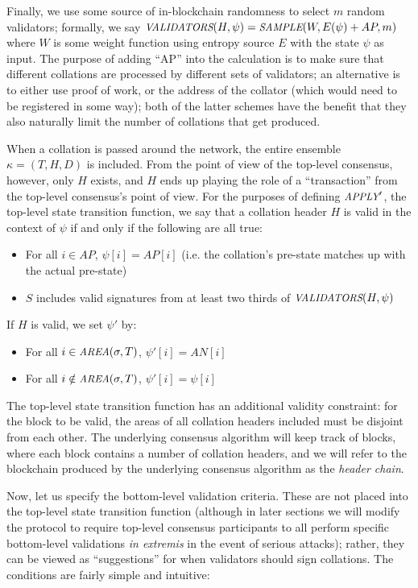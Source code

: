 \documentclass[11pt,a4paper]{article}
\makeatletter
\theoremstyle{plain}
\theoremstyle{definition}
\theoremstyle{remark}
\newcommand{\ie}{i.e.\@\xspace}
\newcommand{\makeintoafunction}[1]{\textit{\uppercase{\small #1}}}
\newcommand{\APPLY}{\makeintoafunction{apply}}
\newcommand{\AREA}{\makeintoafunction{area}}
\newcommand{\VALIDATORS}{\makeintoafunction{validators}}
\newcommand{\SAMPLE}{\makeintoafunction{sample}}
\makeatother
\begin{document}
Finally, we use some source of in-blockchain randomness to select $m$ random validators; formally, we say $\VALIDATORS(H, \psi) = \SAMPLE(W, E(\psi) + AP, m)$ where $W$ is some weight function using entropy source $E$ with the state $\psi$ as input. The purpose of adding ``AP'' into the calculation is to make sure that different collations are processed by different sets of validators; an alternative is to either use proof of work, or the address of the collator (which would need to be registered in some way); both of the latter schemes have the benefit that they also naturally limit the number of collations that get produced.

When a collation is passed around the network, the entire ensemble $\kappa = (T, H, D)$ is included. From the point of view of the top-level consensus, however, only $H$ exists, and $H$ ends up playing the role of a ``transaction'' from the top-level consensus's point of view. For the purposes of defining $\APPLY'$, the top-level state transition function, we say that a collation header $H$ is valid in the context of $\psi$ if and only if the following are all true:

\begin{itemize}
\item
For all $i \in AP$, $\psi[i] = AP[i]$ (\ie the collation's pre-state matches up with the actual pre-state)
\item
$S$ includes valid signatures from at least two thirds of $\VALIDATORS(H, \psi)$
\end{itemize}

If $H$ is valid, we set $\psi'$ by:

\begin{itemize}
\item
For all $i \in \AREA(\sigma, T)$, $\psi'[i] = AN[i]$
\item
For all $i \notin \AREA(\sigma, T)$, $\psi'[i] = \psi[i]$
\end{itemize}

The top-level state transition function has an additional validity constraint: for the block to be valid, the areas of all collation headers included must be disjoint from each other. The underlying consensus algorithm will keep track of blocks, where each block contains a number of collation headers, and we will refer to the blockchain produced by the underlying consensus algorithm as the \emph{header chain}.

Now, let us specify the bottom-level validation criteria. These are not placed into the top-level state transition function (although in later sections we will modify the protocol to require top-level consensus participants to all perform specific bottom-level validations \emph{in extremis} in the event of serious attacks); rather, they can be viewed as ``suggestions'' for when validators should sign collations. The conditions are fairly simple and intuitive:
\end{document}
